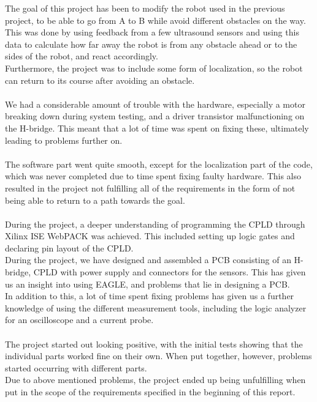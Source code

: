 The goal of this project has been to modify the robot used in the previous project, to be able to go from A to B while avoid different obstacles on the way. This was done by using feedback from a few ultrasound sensors and using this data to calculate how far away the robot is from any obstacle ahead or to the sides of the robot, and react accordingly.\\
Furthermore, the project was to include some form of localization, so the robot can return to its course after avoiding an obstacle.\\\\

We had a considerable amount of trouble with the hardware, especially a motor breaking down during system testing, and a driver transistor malfunctioning on the H-bridge. This meant that a lot of time was spent on fixing these, ultimately leading to problems further on.\\\\

The software part went quite smooth, except for the localization part of the code, which was never completed due to time spent fixing faulty hardware. This also resulted in the project not fulfilling all of the requirements in the form of not being able to return to a path towards the goal.\\\\

During the project, a deeper understanding of programming the CPLD through Xilinx ISE WebPACK was achieved. This included setting up logic gates and declaring pin layout of the CPLD.\\
During the project, we have designed and assembled a PCB consisting of an H-bridge, CPLD with power supply and connectors for the sensors. This has given us an insight into using EAGLE, and problems that lie in designing a PCB.\\
In addition to this, a lot of time spent fixing problems has given us a further knowledge of using the different measurement tools, including the logic analyzer for an oscilloscope and a current probe.\\\\

The project started out looking positive, with the initial tests showing that the individual parts worked fine on their own. When put together, however, problems started occurring with different parts.\\
Due to above mentioned problems, the project ended up being unfulfilling when put in the scope of the requirements specified in the beginning of this report.
